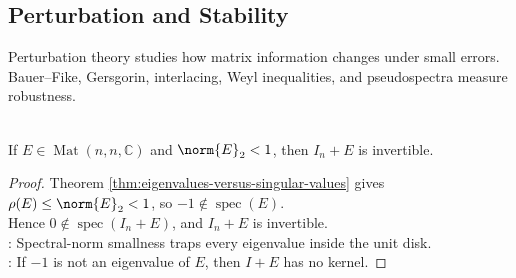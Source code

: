 \subsection{Perturbation and Stability}

%

Perturbation theory studies how matrix information changes under small errors. Bauer--Fike, Gersgorin, interlacing, Weyl inequalities, and pseudospectra measure robustness.

\begin{lemma} \label{lem:small-spectral-norm-perturbation-invertible} \\
If $E\in\operatorname{Mat}(n,n,\mathbb{C})$ and $\norm{E}_2<1$, then $I_n+E$ is invertible.
\begin{proof}
Theorem \ref{thm:eigenvalues-versus-singular-values} gives $\rho(E)\leq\norm{E}_2<1$, so $-1\notin\operatorname{spec}(E)$.\\
Hence $0\notin\operatorname{spec}(I_n+E)$, and $I_n+E$ is invertible.\\
: Spectral-norm smallness traps every eigenvalue inside the unit disk.\\
: If $-1$ is not an eigenvalue of $E$, then $I+E$ has no kernel.
\end{proof}
\end{lemma}

